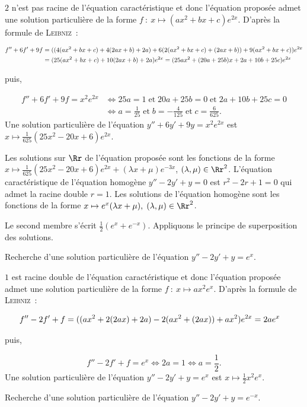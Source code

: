 {{$2$ n'est pas racine de l'équation caractéristique et donc
l'équation proposée admet une solution particulière de la forme $f~:~x\mapsto(ax^2+bx+c)e^{2x}$. D'après la formule
de \textsc{Leibniz}~:

\begin{align*}\ensuremath
f''+6f'+9f&=((4(ax^2+bx+c)+4(2ax+b)+2a)+6(2(ax^2+bx+c)+(2ax+b))+9(ax^2+bx+c))e^{2x}\\
 &=(25(ax^2+bx+c)+10(2ax+b)+2a)e^{2x}=(25ax^2+(20a+25b)x+2a+10b+25c)e^{2x}
\end{align*}

puis,

\begin{align*}
f''+6f'+9f=x^2e^{2x} &\Leftrightarrow 25a=1\;\mbox{et}\;20a+25b=0\;\mbox{et}\;2a+10b+25c=0 \\
&\Leftrightarrow a=\frac{1}{25}\;\mbox{et}\;b=-\frac{4}{125}\;\mbox{et}\;c=\frac{6}{625}.
\end{align*}
Une solution particulière de l'équation $y''+6y'+9y=x^2e^{2x}$ est $x\mapsto\frac{1}{625}(25x^2-20x+6)e^{2x}$.

Les solutions sur $\Rr$ de l'équation proposée sont les fonctions de la forme
$x\mapsto\frac{1}{625}(25x^2-20x+6)e^{2x}+(\lambda x+\mu)e^{-3x}$, $(\lambda,\mu)\in\Rr^2$.
L'équation caractéristique de l'équation homogène $y''-2y'+y=0$ est $r^2-2r+1=0$ qui admet la racine double
$r=1$. Les solutions de l'équation homogène sont les fonctions de la forme $x\mapsto
e^{x}(\lambda x+\mu),\;(\lambda,\mu)\in\Rr^2$.

Le second membre s'écrit $\frac{1}{2}(e^{x}+e^{-x})$. Appliquons le principe de superposition des solutions.

Recherche d'une solution particulière de l'équation $y''-2y'+y=e^{x}$.

$1$ est racine double de l'équation caractéristique et donc
l'équation proposée admet une solution particulière de la forme $f~:~x\mapsto ax^2e^{x}$. D'après la formule
de \textsc{Leibniz}~:

\begin{align*}\ensuremath
f''-2f'+f&=((ax^2+2(2ax)+2a)-2(ax^2+(2ax))+ax^2)e^{2x}=2ae^{x}
\end{align*}

puis,

$$f''-2f'+f=e^{x}\Leftrightarrow2a=1\Leftrightarrow a=\frac{1}{2}.$$
Une solution particulière de l'équation $y''-2y'+y=e^{x}$ est $x\mapsto\frac{1}{2}x^2e^{x}$.

Recherche d'une solution particulière de l'équation $y''-2y'+y=e^{-x}$.

}}
